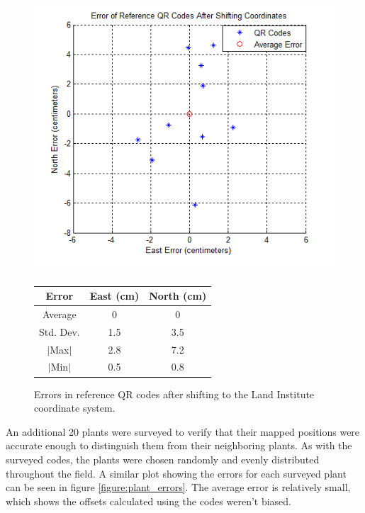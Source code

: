   \begin{figure}
	\centering
    \includegraphics[height=4in]{figures/code_errors.png}
    \label{figure:code_errors}
    \newline
    \newline
    \centering
    \begin{tabular}[c]{|c|c|c|}
       \hline
        Error & East (cm) & North (cm) \\ 
        \hline
        Average   & 0 & 0             \\
        Std. Dev. & 1.5 & 3.5         \\
        $|$Max$|$   & 2.8 & 7.2       \\
        $|$Min$|$   & 0.5 & 0.8       \\
        \hline
    \end{tabular}
    \captionsetup{labelformat=andtable}
    \caption{Errors in reference QR codes after shifting to the Land Institute coordinate system.}
  \end{figure}

An additional 20 plants were surveyed to verify that their mapped positions were accurate enough to distinguish them from their neighboring plants.  As with the surveyed codes, the plants were chosen randomly and evenly distributed throughout the field.   A similar plot showing the errors for each surveyed plant can be seen in figure \ref{figure:plant_errors}.  The average error is relatively small, which shows the offsets calculated using the codes weren't biased.   

